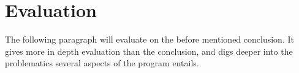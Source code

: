 \section{Evaluation}
\label{sec:eval}

The following paragraph will evaluate on the before mentioned conclusion. It gives more in depth evaluation than the conclusion, and digs deeper into the problematics several aspects of the program entails.




